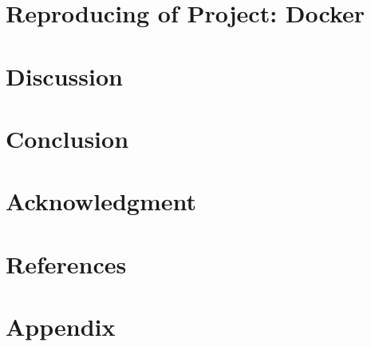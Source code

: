 \documentclass{article}
\begin{document}
\section{Reproducing of Project: Docker}



\section{Discussion}


\section{Conclusion}


\section{Acknowledgment}


\newpage
\section{References}


{
\small
\printbibliography[title=Literature]
}

\appendix

\section{Appendix}\label{Appendix}
\end{document}
